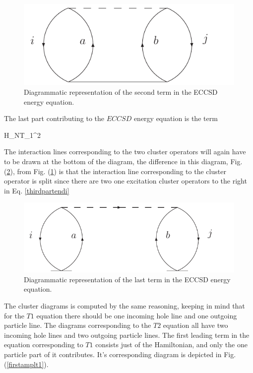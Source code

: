 \begin{figure}[htp]
\centering
\includegraphics[scale=0.75]{secenedi}
\caption{Diagrammatic representation of the second term in the 
ECCSD energy equation.}
\label{secndi}
\end{figure}

The last part contributing to the $ECCSD$ energy equation is the
term 

\be
{}H_NT_1^2
\label{thirdpartendi}
\ee

The interaction lines corresponding to the two cluster operators
will again have to be drawn at the bottom of the diagram, the 
difference in this diagram, Fig. (\ref{thirdenedi}), from 
Fig. (\ref{secndi}) is that the 
interaction line corresponding to the cluster operator is 
split since there are two one excitation cluster operators to
the right in Eq. \eqref{thirdpartendi} 

\begin{figure}[htp]
\centering
\includegraphics[scale=0.75]{thirdenedi}
\caption{Diagrammatic representation of the last term in the 
ECCSD energy equation.}
\label{thirdenedi}
\end{figure}

The cluster diagrams is computed by the same reasoning, keeping in mind that
for the $T1$ equation there should be one incoming hole line and one outgoing
particle line. The diagrams corresponding to the $T2$ equation all have two
incoming hole lines and two outgoing particle lines. The first leading term 
in the equation corresponding to $T1$ consists just of the Hamiltonian, and 
only the one particle part of it contributes. It's corresponding diagram is
depicted in Fig. (\ref{firstamplt1}).  


